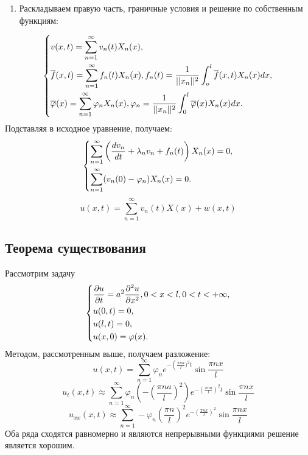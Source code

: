 \documentclass[11pt]{article}
\begin{document}
\begin{enumerate}
\item Раскладываем правую часть, граничные условия и решение по собственным функциям:
\end{enumerate}
\begin{equation}
\begin{dcases}
v(x, t) = \sum_{n = 1}^{\infty}v_n(t)X_n(x), \\
\overline{f}(x, t) = \sum_{n = 1}^{\infty}f_n(t)X_n(x), f_n(t) = \frac1{||x_n||^2}\int_{o}^l\overline{f}(x, t)X_n(x)dx, \\
\overline{\varphi}(x) = \sum_{n = 1}^{\infty}\varphi_nX_n(x), \varphi_n = \frac1{||x_n||^2}\int_0^l\overline{\varphi}(x)X_n(x)dx.
\end{dcases}
\end{equation}
Подставляя в исходное уравнение, получаем:
\begin{equation}
\begin{dcases}
\sum_{n = 1}^{\infty}\left(\frac{dv_n}{dt} + \lambda_nv_n + f_n(t)\right)X_n(x) = 0, \\
\sum_{n = 1}^{\infty}(v_{n}(0) - \varphi_n)X_n(x) = 0.
\end{dcases}
\end{equation}
$$u(x, t) = \sum_{n = 1}^{\infty}v_{n}(t)X(x) + w(x, t)$$
\subsection{Теорема существования}
\label{sec:org62b6957}
Рассмотрим задачу
\begin{equation}
\begin{dcases}
\frac{\partial u}{\partial t} = a^2\frac{\partial^2 u}{\partial x^2}, 0 < x < l, 0 < t < +\infty, \\
u(0, t) = 0, \\
u(l, t) = 0, \\
u(x, 0) = \varphi(x).
\end{dcases}
\end{equation}
Методом, рассмотренным выше, получаем разложение:
\begin{equation}
u(x, t) = \sum_{n = 1}^{\infty}\varphi_ne^{-\left(\frac{\pi n a}l)^2t}\sin{\frac{\pi n x}l}
\end{equation}
$$u_t(x, t) \approx \sum_{n = 1}^{\infty}\varphi_n\left(-\left(\frac{\pi n a}l\right)^2\right)e^{-\left(\frac{\pi n a}l\right)^2t}\sin{\frac{\pi n x}l}$$
$$u_{xx}(x, t) \approx \sum_{n = 1}^{\infty}-\varphi_n\left(\frac{\pi n}l\right)^2e^{-\left(\frac{\pi n x}l\right)^2}\sin\frac{\pi n x}l$$
Оба ряда сходятся равномерно и являются непрерывными функциями \Rightarrow решение является хорошим.
\end{document}
